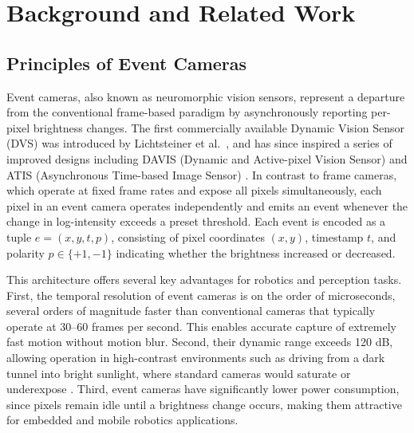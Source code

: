 \chapter{Background and Related Work}\label{chap:background}

\section{Principles of Event Cameras}

Event cameras, also known as neuromorphic vision sensors, represent a departure from the conventional frame-based paradigm by asynchronously reporting per-pixel brightness changes. The first commercially available Dynamic Vision Sensor (DVS) was introduced by Lichtsteiner et al.~\cite{Lichtsteiner2008DVS}, and has since inspired a series of improved designs including DAVIS (Dynamic and Active-pixel Vision Sensor) \cite{Brandli2014DAVIS} and ATIS (Asynchronous Time-based Image Sensor) \cite{Posch2014Retinomorphic}. In contrast to frame cameras, which operate at fixed frame rates and expose all pixels simultaneously, each pixel in an event camera operates independently and emits an event whenever the change in log-intensity exceeds a preset threshold. Each event is encoded as a tuple $e=(x,y,t,p)$, consisting of pixel coordinates $(x,y)$, timestamp $t$, and polarity $p \in \{+1,-1\}$ indicating whether the brightness increased or decreased.

This architecture offers several key advantages for robotics and perception tasks. First, the temporal resolution of event cameras is on the order of microseconds, several orders of magnitude faster than conventional cameras that typically operate at 30–60 frames per second. This enables accurate capture of extremely fast motion without motion blur. Second, their dynamic range exceeds 120 dB, allowing operation in high-contrast environments such as driving from a dark tunnel into bright sunlight, where standard cameras would saturate or underexpose \cite{Gallego2020Survey}. Third, event cameras have significantly lower power consumption, since pixels remain idle until a brightness change occurs, making them attractive for embedded and mobile robotics applications.

